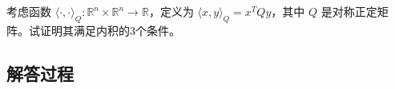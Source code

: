 \begin{example}[内积性质验证]
    考虑函数 \(\langle\cdot,\cdot\rangle_Q: \mathbb{R}^n \times \mathbb{R}^n \to \mathbb{R}\)，定义为 \(\langle x,y\rangle_Q = x^T Qy\)，其中 \(Q\) 是对称正定矩阵。试证明其满足内积的3个条件。
    \end{example}
    
    \subsection*{解答过程}
    